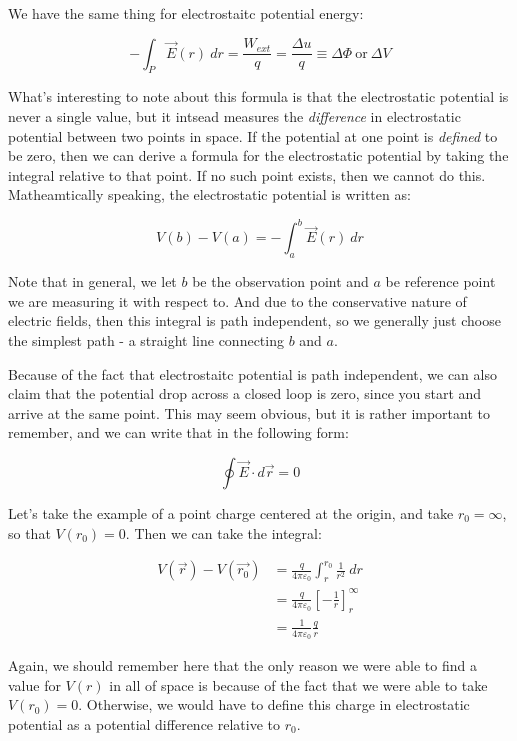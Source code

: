 \documentclass{report}
\theoremstyle{definition}
\numberwithin{equation}{section}
\numberwithin{definition}{section}
\begin{document}
    We have the same thing for electrostaitc potential energy:

    \[ -\int_{P} \vec{E}(r) \ dr = \frac{W_{ext}}{q} = \frac{\Delta u}{q} \equiv \Delta \Phi \ \text{or} \ \Delta V\]

    What's interesting to note about this formula is that the electrostatic potential is never a single value, but it intsead measures the \textit{difference} in electrostatic potential between two points in space. If the potential at one point is \textit{defined} to be zero, then we can derive a formula for the electrostatic potential by taking the integral relative to that point. If no such point exists, then we cannot do this. Matheamtically speaking, the electrostatic potential is written as:

    \begin{theorem}
        \[V(b) - V(a) = -\int_a^b \vec{E}(r) \ dr\]

        Note that in general, we let $b$ be the observation point and $a$ be reference point we are measuring it with respect to. And due to the conservative nature of electric fields, then this integral is path independent, so we generally just choose the simplest path - a straight line connecting $b$ and $a$. 
    \end{theorem}

    Because of the fact that electrostaitc potential is path independent, we can also claim that the potential drop across a closed loop is zero, since you start and arrive at the same point. This may seem obvious, but it is rather important to remember, and we can write that in the following form: 

    \[ \oint \vec{E} \cdot d\vec{r} = 0\]

    Let's take the example of a point charge centered at the origin, and take $r_0 = \infty$, so that $V(r_0) = 0$. Then we can take the integral:
    
    \begin{align*}
        V(\vec{r}) - V(\vec{r_0}) &= \frac{q}{4\pi\varepsilon_0} \int_r^{r_0} \frac{1}{r^2} \ dr\\
        &= \frac{q}{4\pi \varepsilon_0}\left[-\frac{1}{r}\right]_r^\infty\\
        &= \frac{1}{4\pi\varepsilon_0} \frac q r
    \end{align*}

    Again, we should remember here that the only reason we were able to find a value for $V(r)$ in all of space is because of the fact that we were able to take $V(r_0) = 0$. Otherwise, we would have to define this charge in electrostatic potential as a potential difference relative to $r_0$. 
\end{document}
